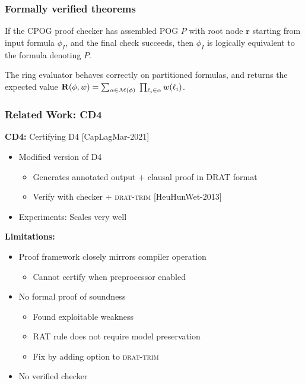 \documentclass[t,pdf]{beamer}
\newcommand{\reference}[1]{{\footnotesize [#1]}}
\newcommand{\bitem}{\item[$\bullet$]}
\newcommand{\makenode}[1]{{\mathbf #1}}
\newcommand{\noder}{\makenode{r}}
\begin{document}
\begin{frame}
  \frametitle{Formally verified theorems}
  \medskip

  \begin{theorem}
    If the CPOG proof checker has assembled POG $P$ with root node $\noder$ starting from input formula $\phi_I$, and the final check succeeds, then $\phi_I$ is logically equivalent to the formula denoting $P$.
  \end{theorem}

  \begin{theorem}
    The ring evaluator behaves correctly on partitioned formulas, and returns the expected value ${\bf R}(\phi, w) = \sum_{\alpha \in {\cal M}(\phi)} \; \prod_{\ell_i \in \alpha} w(\ell_i)$.
  \end{theorem}

\end{frame}

\begin{frame}
  \frametitle{Related Work: CD4}
  \medskip
  
  {\bf CD4:} Certifying D4 \reference{CapLagMar-2021}
  \begin{itemize}
  \item Modified version of D4
    \begin{itemize}
    \item Generates annotated output + clausal proof in DRAT format
    \item Verify with checker + \textsc{drat-trim} \reference{HeuHunWet-2013}
    \end{itemize}
  \item Experiments: Scales very well
  \end{itemize}
   \medskip
       {\bf Limitations:}
       \begin{itemize}
       \item Proof framework closely mirrors compiler operation
         \begin{itemize}
           \bitem Cannot certify when preprocessor enabled
         \end{itemize}
       \item No formal proof of soundness
         \begin{itemize}
         \bitem Found exploitable weakness
         \bitem RAT rule does not require model preservation
         \bitem Fix by adding option to \textsc{drat-trim}
         \end{itemize}
       \item No verified checker
       \end{itemize}

\end{frame}
\end{document}
